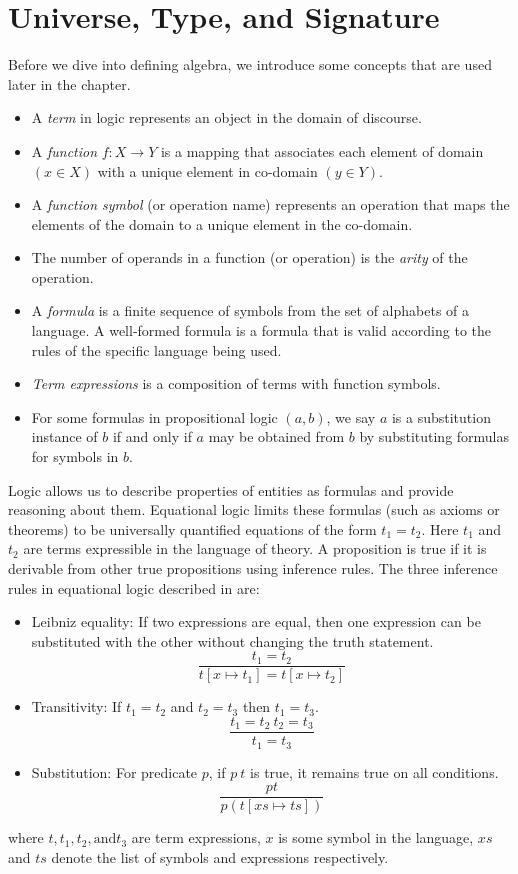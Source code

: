\section{Universe, Type, and Signature}
Before we dive into defining algebra, we introduce some concepts that are
used later in the chapter.
\begin{itemize}
    \item  A \emph{term} in logic represents an object in the domain of
    discourse.
    \item  A \emph{function} $f: X \rightarrow Y$ is a mapping that associates each
    element of domain $(x \in X)$ with a unique element in co-domain $(y \in Y)$.
    \item  A \emph{function symbol} (or operation name) represents an operation
    that maps the elements of the domain to a unique element in the co-domain.
    \item The number of operands in a function (or operation) is the \emph{arity} of
    the operation.
    \item A \emph{formula} is a finite sequence of symbols from the set of alphabets of a
    language. A well-formed formula is a formula that is valid according
    to the rules of the specific language being used.
    \item \emph{Term expressions} is a composition of terms with function symbols.
    \item For some formulas in propositional logic $(a,b)$, we say $a$ is a
    substitution instance of $b$ if and only if $a$ may be obtained from $b$ by
    substituting formulas for symbols in $b$.
\end{itemize}

\label{universe}
Logic allows us to describe properties of entities as formulas and provide
reasoning about them. Equational logic limits these formulas (such as axioms
or theorems) to be universally quantified equations of the form $t_1 = t_2$.
Here $t_1$ and $t_2$ are terms expressible in the language of theory. A
proposition is true if it is derivable from other true propositions using
inference rules. The three inference rules in equational logic described in
\cite{gries2013logical} are:
\begin{itemize}
    \item Leibniz equality: If two expressions are equal, then one expression
    can be substituted with the other without changing the truth statement.
    \[\frac{t_1 = t_2}{t[x \mapsto t_1] = t[x \mapsto t_2]}\]
    \item Transitivity: If $t_1 = t_2$ and $t_2 = t_3$ then $t_1 = t_3$.
    \[{\frac{t_1 = t_2\ t_2 = t_3}{t_1 = t_3}}\]
    \item Substitution: For predicate $p$, if $p\ t$ is true, it remains true on all
    conditions. \[\frac{p t}{p(t[xs \mapsto ts])}\]
\end{itemize}
where $t,t_1,t_2, \text{and} t_3$ are term expressions, $x$ is some symbol in
the language, $xs$ and $ts$ denote the list of symbols and expressions
respectively. 

